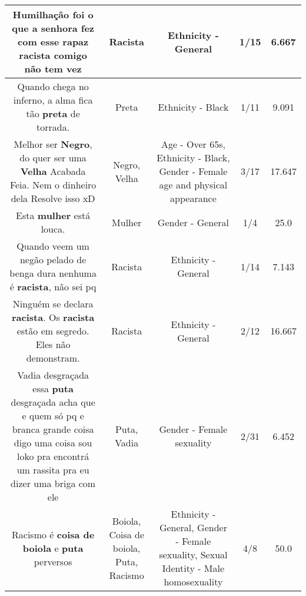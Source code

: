 \documentclass[11pt]{article}
\newlength\mylength
\begin{document}
\begin{center}
\begin{longtable}{|C{.65\mylength}|C{.30\mylength}|C{.12\mylength}|C{.12\mylength}|C{.12\mylength}|}
  \small Humilhação foi o que a senhora fez  com esse rapaz \textbf{racista} comigo não tem vez\normalsize   & Racista & Ethnicity - General & 1/15 & 6.667 \\  \hline
  \small Quando chega no inferno, a alma fica tão \textbf{preta} de torrada.\normalsize   & Preta & Ethnicity - Black & 1/11 & 9.091 \\  \hline
  \small Melhor ser \textbf{Negro}, do quer ser uma \textbf{V\textbf{elha}} Acabada Feia. Nem o dinheiro dela Resolve isso xD\normalsize   & Negro, Velha & Age - Over 65s, Ethnicity - Black, Gender - Female age and physical appearance & 3/17 & 17.647 \\  \hline
  \small Esta \textbf{mulher} está louca.\normalsize   & Mulher & Gender - General & 1/4 & 25.0 \\  \hline
  \small Quando veem um negão pelado de benga dura nenhuma é \textbf{racista}, não sei pq\normalsize   & Racista & Ethnicity - General & 1/14 & 7.143 \\  \hline
  \small Ninguém se declara \textbf{racista}. Os \textbf{racista} estão em segredo. Eles não demonstram.\normalsize   & Racista & Ethnicity - General & 2/12 & 16.667 \\  \hline
  \small Vadia desgraçada essa \textbf{puta} desgraçada acha que e quem só pq e branca grande coisa digo uma coisa sou loko pra encontrá um rassita pra eu dizer uma briga com ele\normalsize   & Puta, Vadia & Gender - Female sexuality & 2/31 & 6.452 \\  \hline
  \small Racismo é \textbf{coisa de b\textbf{oiola}} e \textbf{puta} perversos\normalsize   & Boiola, Coisa de boiola, Puta, Racismo & Ethnicity - General, Gender - Female sexuality, Sexual Identity - Male homosexuality & 4/8 & 50.0 \\  \hline

\end{longtable}
\end{center}
\end{document}
